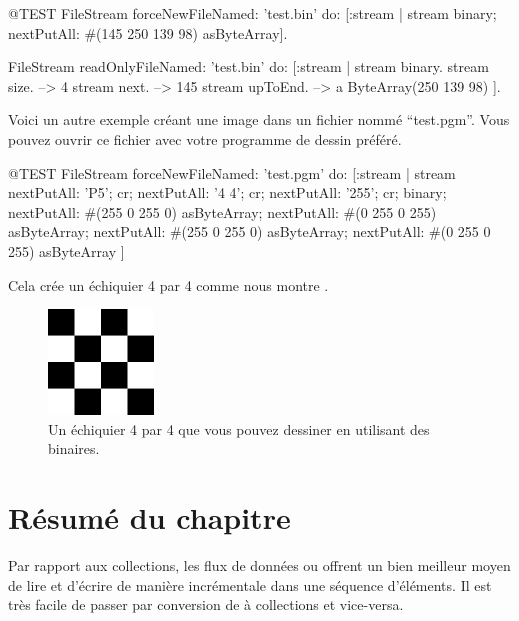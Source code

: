 \documentclass[a4paper,10pt,twoside]{book}
\begin{document}
\begin{code}{@TEST}
FileStream
  forceNewFileNamed: 'test.bin'
  do: [:stream |
          stream
            binary;
            nextPutAll: #(145 250 139 98) asByteArray].

FileStream
  readOnlyFileNamed: 'test.bin'
  do: [:stream |
          stream binary.
          stream size.         --> 4
          stream next.         --> 145
          stream upToEnd. --> a ByteArray(250 139 98)
      ].
\end{code}

Voici un autre exemple cr\'eant une image dans un fichier nomm\'e
``test.pgm''. Vous pouvez ouvrir ce fichier avec votre programme de
dessin pr\'ef\'er\'e.

\begin{code}{@TEST}
FileStream
  forceNewFileNamed: 'test.pgm' 
  do: [:stream |
	stream
		nextPutAll: 'P5'; cr;
		nextPutAll: '4 4'; cr;
		nextPutAll: '255'; cr;
		binary;
		nextPutAll: #(255 0 255 0) asByteArray;
		nextPutAll: #(0 255 0 255) asByteArray;
		nextPutAll: #(255 0 255 0) asByteArray;
		nextPutAll: #(0 255 0 255) asByteArray
	]
\end{code}

Cela cr\'ee un \'echiquier 4 par 4 comme nous montre .

\begin{figure}[!ht]
\centerline{\includegraphics[width=0.25\textwidth]{checkerboard4x4}}
\caption{Un \'echiquier 4 par 4 que vous pouvez dessiner en utilisant des \streams binaires.}
\label{fig:checkerboard4x4}
\vspace{.2in}
\end{figure}

\section{R\'esum\'e du chapitre}

Par rapport aux collections, les flux de donn\'ees ou \streams offrent
un bien meilleur moyen de lire et d'\'ecrire de mani\`ere
incr\'ementale dans une s\'equence d'\'el\'ements.
Il est tr\`es facile de passer par conversion de \streams \`a collections et vice-versa.
\end{document}
